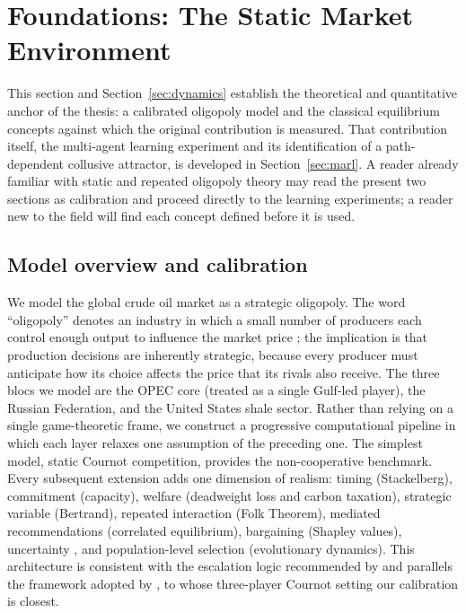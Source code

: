 \section{Foundations: The Static Market Environment}
\label{sec:foundations}

This section and Section~\ref{sec:dynamics} establish the
theoretical and quantitative anchor of the thesis: a calibrated
oligopoly model and the classical equilibrium concepts against
which the original contribution is measured. That contribution
itself, the multi-agent learning experiment and its
identification of a path-dependent collusive attractor, is
developed in Section~\ref{sec:marl}. A reader already familiar
with static and repeated oligopoly theory may read the present
two sections as calibration and proceed directly to the learning
experiments; a reader new to the field will find each concept
defined before it is used.

\subsection{Model overview and calibration}
\label{subsec:model}

We model the global crude oil market as a strategic oligopoly. The word
``oligopoly'' denotes an industry in which a small number of producers
each control enough output to influence the market price
\citep{bresnahan1989}; the implication is that production decisions are
inherently strategic, because every producer must anticipate how its
choice affects the price that its rivals also receive. The three blocs
we model are the OPEC core (treated as a single Gulf-led player), the
Russian Federation, and the United States shale sector. Rather than
relying on a single game-theoretic frame, we construct a progressive
computational pipeline in which each layer relaxes one assumption of the
preceding one. The simplest model, static Cournot competition, provides
the non-cooperative benchmark. Every subsequent extension adds one
dimension of realism: timing (Stackelberg), commitment (capacity),
welfare (deadweight loss and carbon taxation), strategic variable
(Bertrand), repeated interaction (Folk Theorem), mediated recommendations
(correlated equilibrium), bargaining (Shapley values), uncertainty
\citep{greenporter1984}, and population-level selection (evolutionary
dynamics). This architecture is consistent with the escalation logic
recommended by \citet[p.~??]{tirole1988} and parallels the framework adopted by
\citet{alcelay2017}, to whose three-player Cournot setting our
calibration is closest.

